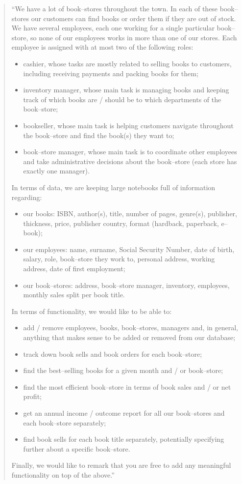 \documentclass[a4paper, 10pt]{article}
\begin{document}
	\begin{quote}
		``We have a lot of book--stores throughout the town. In each of these book--stores our customers can find books or order them if they are out of stock. We have several employees, each one working for a single particular book--store, so none of our employees works in more than one of our stores. Each employee is assigned with at most two of the following roles:
		\begin{itemize}
			\item cashier, whose tasks are mostly related to selling books to customers, including receiving payments and packing books for them;
			\item inventory manager, whose main task is managing books and keeping track of which books are / should be to which departments of the book--store;
			\item bookseller, whose main task is helping customers navigate throughout the book--store and find the book(s) they want to;
			\item book--store manager, whose main task is to coordinate other employees and take administrative decisions about the book--store (each store has exactly one manager).
		\end{itemize}
		In terms of data, we are keeping large notebooks full of information regarding:
		\begin{itemize}
			\item our books: ISBN, author(s), title, number of pages, genre(s), publisher, thickness, price, publisher country, format (hardback, paperback, e--book);
			\item our employees: name, surname, Social Security Number, date of birth, salary, role, book--store they work to, personal address, working address, date of first employment;
			\item our book--stores: address, book--store manager, inventory, employees, monthly sales split per book title.
		\end{itemize}
		In terms of functionality, we would like to be able to:
		\begin{itemize}
			\item add / remove employees, books, book--stores, managers and, in general, anything that makes sense to be added or removed from our database;
			\item track down book sells and book orders for each book--store;
			\item find the best--selling books for a given month and / or book--store;
			\item find the most efficient book--store in terms of book sales and / or net profit;
			\item get an annual income / outcome report for all our book--stores and each book--store separately;
			\item find book sells for each book title separately, potentially specifying further about a specific book--store.
		\end{itemize}
		Finally, we would like to remark that you are free to add any meaningful functionality on top of the above.''
	\end{quote}
	
\end{document}
